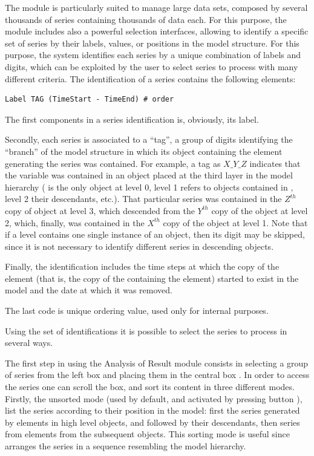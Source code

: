 \documentclass [11pt,a4paper] {book}
\begin{document}
The module is particularly suited to manage large data sets, composed by several thousands of series containing thousands of data each. For this purpose, the module includes also a powerful selection interfaces, allowing to identify a specific set of series by their labels, values, or positions in the model structure. For this purpose, the system identifies each series by a unique combination of labels and digits, which can be exploited by the user to select series to process with many different criteria. The identification of a series contains the following elements:

\begin{verbatim}
Label TAG (TimeStart - TimeEnd) # order
\end{verbatim}

The first components in a series identification is, obviously, its label. 

Secondly, each series is associated to a ``tag'', a group of digits identifying the ``branch'' of the model structure in which its object containing the element generating the series was contained. For example, a tag as $X\_Y\_Z$ indicates that the variable was contained in an object placed at the third layer in the model hierarchy ( is the only object at level 0, level 1 refers to objects contained in , level 2 their descendants, etc.). That particular series was contained in the $Z^{th}$ copy of object at level 3, which descended from the $Y^{th}$ copy of the object at level 2, which, finally, was contained in the $X^{th}$ copy of the object at level 1. Note that if a level contains one single instance of an object, then its digit may be skipped, since it is not necessary to identify different series in descending objects.

Finally, the identification includes the time steps at which the copy of the element (that is, the copy of the containing the element) started to exist in the model and the date at which it was removed.

The last code is unique ordering value, used only for internal purposes.

Using the set of identifications it is possible to select the series to process in several ways. 


The first step in using the Analysis of Result module consists in selecting a group of series from the left box  and placing them in the central box . In order to access the series one can scroll the  box, and sort its content in three different modes. Firstly, the unsorted mode (used by default, and activated by pressing button ), list the series according to their position in the model: first the series generated by elements in high level objects, and followed by their descendants, then series from elements from the subsequent objects. This sorting mode is useful since arranges the series in a sequence resembling the model hierarchy.
\end{document}
